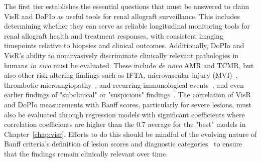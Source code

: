 %
%
%
%

The first tier establishes the essential questions that must be answered to claim VisR and DoPIo as useful tools for renal allograft surveillance. This includes determining whether they can serve as reliable longitudinal monitoring tools for renal allograft health and treatment responses, with consistent imaging timepoints relative to biopsies and clinical outcomes. Additionally, DoPIo and VisR's ability to noninvasively discriminate clinically relevant pathologies in humans \emph{in vivo} must be evaluated. These include \emph{de novo} AMR and TCMR, but also other risk-altering findings such as IFTA, microvascular injury (MVI)~\cite{bohmig_Microvascular_2025,callemeyn_Allorecognition_2022,sablik_Microvascular_2025}, thrombotic microangiopathy~\cite{arnold_Thrombotic_2017,afrouzian_Thrombotic_2023,genest_Renal_2023}, and recurring immunological events~\cite{helantera_Revisiting_2022,ho_Effectiveness_2022,kanbay_metaanalysis_2025}, and even earlier findings of "subclinical" or "suspicious" findings~\cite{loupy_Subclinical_2015,mehta_Longterm_2022}. The correlation of VisR and DoPIo measurements with Banff scores, particularly for severe lesions, must also be evaluated through regression models with significant coefficients where correlation coefficients are higher than the 0.7 average for the "best" models in Chapter~\ref{chap:visr}. Efforts to do this should be mindful of the evolving nature of Banff criteria's definition of lesion scores and diagnostic categories~\cite{callemeyn_Revisiting_2021} to ensure that the findings remain clinically relevant over time.

